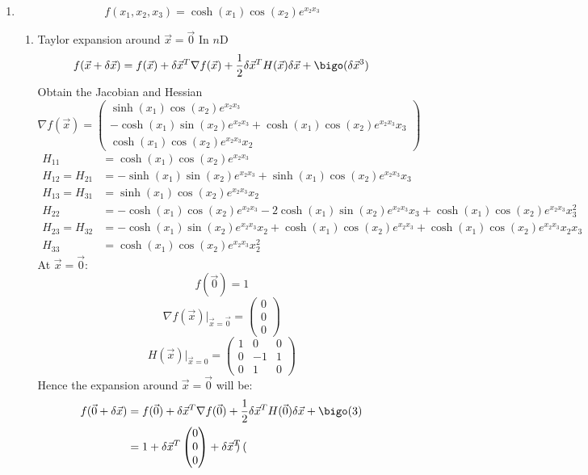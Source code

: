 \documentclass{X:/Documents/Coding/Latex/myassignment}
\begin{document}
\begin{enumerate}
\begin{enumerate}
	\end{enumerate}
	\item 
	\[f(x_1,x_2,x_3) = \cosh(x_1) \cos(x_2) e^{x_2x_3}\]
	\begin{enumerate}
		\item Taylor expansion around $\vec x = \vec 0$
		In $n$D
		\[f(\vec x + \delta \vec x) = f(\vec x) + \delta \vec x^T\nabla f(\vec x) + \frac12 \delta \vec x^T H(\vec x) \delta \vec x + \bigo(\delta \vec x^3)\]
		Obtain the Jacobian and Hessian
		\[\nabla f(\vec x) = \begin{pmatrix}
			\sinh(x_1)\cos(x_2)e^{x_2x_3}\\
			-\cosh(x_1)\sin(x_2)e^{x_2x_3} + \cosh(x_1)\cos(x_2)e^{x_2x_3}x_3\\
			\cosh(x_1)\cos(x_2)e^{x_2x_3}x_2
		\end{pmatrix}\]
		\begin{align*}
			H_{11} &=\cosh(x_1)\cos(x_2)e^{x_2x_3}\\
			H_{12} = H_{21} &=-\sinh(x_1)\sin(x_2)e^{x_2x_3} + \sinh(x_1)\cos(x_2)e^{x_2x_3}x_3 \\
			H_{13} = H_{31} &= \sinh(x_1)\cos(x_2)e^{x_2x_3}x_2\\
			H_{22} &= -\cosh(x_1)\cos(x_2)e^{x_2x_3} - 2\cosh(x_1)\sin(x_2)e^{x_2x_3}x_3 + \cosh(x_1)\cos(x_2) e^{x_2x_3}x_3^2\\
			H_{23} = H_{32} &= -\cosh(x_1)\sin(x_2)e^{x_2x_3}x_2 + \cosh(x_1)\cos(x_2)e^{x_2x_3} + \cosh(x_1)\cos(x_2)e^{x_2x_3}x_2x_3 \\
			H_{33} &= \cosh(x_1)\cos(x_2)e^{x_2x_3}x_2^2
		\end{align*}
		At $\vec x = \vec 0 $:
		\[f(\vec 0) = 1 \]
		\[\nabla f(\vec x)|_{\vec x=\vec 0} = \begin{pmatrix} 0\\0\\0\end{pmatrix}\]
		\[H(\vec x)|_{\vec x=0} = \begin{pmatrix}
			1 &0 &0\\
			0 &-1 &1\\
			0 &1 & 0			
		\end{pmatrix}\]
		Hence the expansion around $\vec x = \vec 0$ will be:
		\begin{align*}
			f(\vec 0 + \delta \vec x) &= f(\vec 0) + \delta \vec x^T \nabla f(\vec 0) + \frac12 \delta \vec x^T H(\vec 0) \delta \vec x + \bigo(3)\\
			&= 1 + \delta \vec x ^T \begin{pmatrix} 0\\0\\0\end{pmatrix} + \delta \vec x^T \begin{pmatrix}

\end{pmatrix}
\end{align*}
\end{enumerate}
\end{enumerate}
\end{document}
